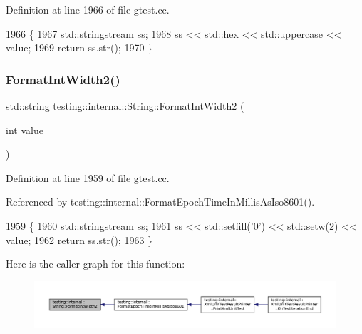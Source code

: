 Definition at line 1966 of file gtest.\+cc.


\begin{DoxyCode}
1966                                         \{
1967   std::stringstream ss;
1968   ss << std::hex << std::uppercase << value;
1969   \textcolor{keywordflow}{return} ss.str();
1970 \}
\end{DoxyCode}
\mbox{\label{classtesting_1_1internal_1_1String_af50b18d588355871e1982c4043523e0f}} 
\subsubsection{\texorpdfstring{Format\+Int\+Width2()}{FormatIntWidth2()}}
{\footnotesize\ttfamily std\+::string testing\+::internal\+::\+String\+::\+Format\+Int\+Width2 (\begin{DoxyParamCaption}\item[{int}]{value }\end{DoxyParamCaption})\hspace{0.3cm}{\ttfamily [static]}}



Definition at line 1959 of file gtest.\+cc.



Referenced by testing\+::internal\+::\+Format\+Epoch\+Time\+In\+Millis\+As\+Iso8601().


\begin{DoxyCode}
1959                                            \{
1960   std::stringstream ss;
1961   ss << std::setfill(\textcolor{charliteral}{'0'}) << std::setw(2) << value;
1962   \textcolor{keywordflow}{return} ss.str();
1963 \}
\end{DoxyCode}
Here is the caller graph for this function\+:
\nopagebreak
\begin{figure}[H]
\begin{center}
\leavevmode
\includegraphics[width=350pt]{classtesting_1_1internal_1_1String_af50b18d588355871e1982c4043523e0f_icgraph}
\end{center}
\end{figure}
\mbox{\label{classtesting_1_1internal_1_1String_aaf7e376ff580677ea4954d5913d5b917}} 
